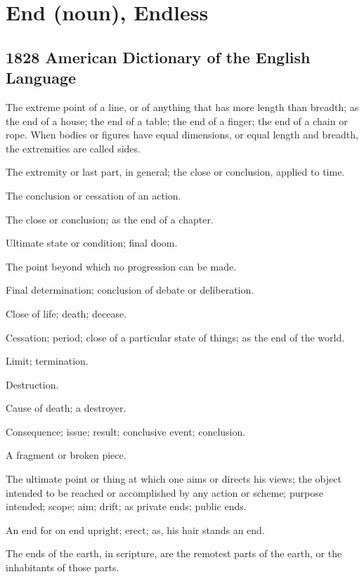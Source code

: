 \section{End (noun), Endless}
	\label{END}
	

\subsection{1828 American Dictionary of the English Language} %
	\label{END-1828}

	\begin{compactitem}
		\item[1] The extreme point of a line, or of anything that has more length than breadth; as the end of a house; the end of a table; the end of a finger; the end of a chain or rope. When bodies or figures have equal dimensions, or equal length and breadth, the extremities are called sides.
		\item[2] The extremity or last part, in general; the close or conclusion, applied to time.
		\item[3] The conclusion or cessation of an action.
		\item[4] The close or conclusion; as the end of a chapter.
		\item[5] Ultimate state or condition; final doom.
		\item[6] The point beyond which no progression can be made.
		\item[7] Final determination; conclusion of debate or deliberation.
		\item[8] Close of life; death; decease.
		\item[9] Cessation; period; close of a particular state of things; as the end of the world.
		\item[10] Limit; termination.
		\item[11] Destruction.
		\item[12] Cause of death; a destroyer.
		\item[13] Consequence; issue; result; conclusive event; conclusion.
		\item[14] A fragment or broken piece.
		\item[15] The ultimate point or thing at which one aims or directs his views; the object intended to be reached or accomplished by any action or scheme; purpose intended; scope; aim; drift; as private ends; public ends.
		\item[16] An end for on end upright; erect; as, his hair stands an end.
		\item[17] The ends of the earth, in scripture, are the remotest parts of the earth, or the inhabitants of those parts.
	\end{compactitem}

